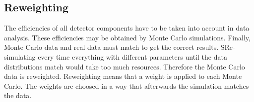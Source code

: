 \documentclass[english]{uzhpub}
\begin{document}
\subsection{Reweighting}
The efficiencies of all detector components have to be taken into account in data analysis. These efficiencies may be obtained by Monte Carlo simulations. Finally, Monte Carlo data and real data must match to get the correct results. SRe-simulating every time everything with different parameters until the data distributions match would take too much resources. Therefore the Monte Carlo data is reweighted. Reweighting means that a weight is applied to each Monte Carlo. The weights are choosed in a way that afterwards the simulation matches the data.



















%
\end{document}
